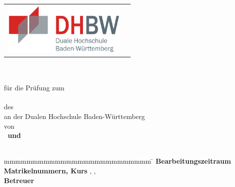 
\begin{titlepage}
	\begin{longtable}{p{} p{}}
	  {\includegraphics[height=2.6cm]{images/dhbw.png}}
	\end{longtable}
	\enlargethispage{20mm}
	\begin{center}
	  \vspace*{12mm}	{\LARGE\bf \titel }\\
	  \vspace*{12mm}	{\large\bf \arbeit}\\
	  \vspace*{12mm}	für die Prüfung zum\\
	  \vspace*{3mm} 	{\bf \abschluss}\\
	  \vspace*{12mm}	des \studiengang\\
	  \vspace*{3mm} 	an der Dualen Hochschule Baden-Württemberg \dhbw\\
	  \vspace*{12mm}	von\\
	  \vspace*{3mm} 	{\large\bf \aram\ und \fabian}\\
	  \vspace*{12mm}	\datumAbgabe\\
	\end{center}
	\vfill
	\begin{spacing}{1.2}
	\begin{tabbing}
		mmmmmmmmmmmmmmmmmmmmmmmmmm     \= \kill
		\textbf{Bearbeitungszeitraum}  \>  \zeitraum\\
		\textbf{Matrikelnummern, Kurs}  \>  \martrikelnrAram, \martrikelnrFabian, \kurs\\
		\textbf{Betreuer}              \>  \betreuer
	\end{tabbing}
	\end{spacing}
\end{titlepage}
